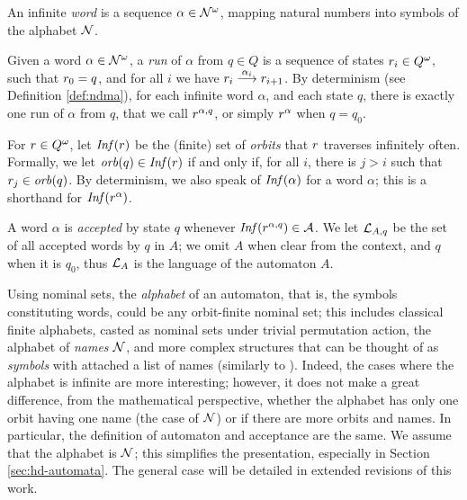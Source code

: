 \begin{definition}
 An infinite \emph{word} is a sequence $\alpha \in \mathcal{N}^\omega$, mapping natural numbers into symbols of the alphabet $\mathcal{N}$.
\end{definition}

\begin{definition}\label{def:nominal-run}
 Given a word $\alpha \in \mathcal{N}^\omega$, a \emph{run} of $\alpha$ from $q \in Q$ is a sequence of states $r_i \in Q^\omega$, such that $r_0 = q$, and for all $i$ we have $r_i \overset{\alpha_i}{\longrightarrow} r_{i+1}$. 
 By determinism (see Definition \ref{def:ndma}), for each infinite word $\alpha$, and each state $q$, there is exactly one run of $\alpha$ from $q$, that we call $r^{\alpha,q}$, or simply $r^{\alpha}$ when $q=q_0$.
\end{definition}

\begin{definition}
 For $r \in Q^\omega$, let $\mathit{Inf}(r)$ be the (finite) set of \emph{orbits} that $r$ traverses infinitely often. Formally, we let $\mathit{orb}(q) \in \mathit{Inf}(r)$ if and only if, for all $i$, there is $j > i$ such that $r_j \in \mathit{orb}(q)$. By determinism, we also speak of $\mathit{Inf}(\alpha)$ for a word $\alpha$; this is a shorthand for $\mathit{Inf}(r^\alpha)$.
\end{definition}

\begin{definition}
 A word $\alpha$ is \emph{accepted} by state $q$ whenever $\mathit{Inf}(r^{\alpha,q}) \in \mathcal{A}$. We let $\mathcal{L}_{A,q}$ be the set of all accepted words by $q$ in $A$; we omit $A$ when clear from the context, and $q$ when it is $q_0$, thus $\mathcal{L}_A$ is the language of the automaton $A$.
\end{definition}

\begin{remark}\label{rem:simple-alphabet} Using nominal sets, the \emph{alphabet} of an automaton, that is, the symbols constituting words, could be any orbit-finite nominal set; this includes classical finite alphabets, casted as nominal sets under trivial permutation action, the alphabet of \emph{names} $\mathcal{N}$, and more complex structures that can be thought of as \emph{symbols} with attached a list of names (similarly to \cite{MikBartekLICS}). Indeed, the cases where the alphabet is infinite are more interesting; however, it does not make a great difference, from the mathematical perspective, whether the alphabet has only one orbit having one name (the case of $\mathcal{N}$) or if there are more orbits and names. In particular, the definition of automaton and acceptance are the same. We assume that the alphabet is $\mathcal{N}$; this simplifies the presentation, especially in Section \ref{sec:hd-automata}. The general case will be detailed in extended revisions of this work.
\end{remark}

